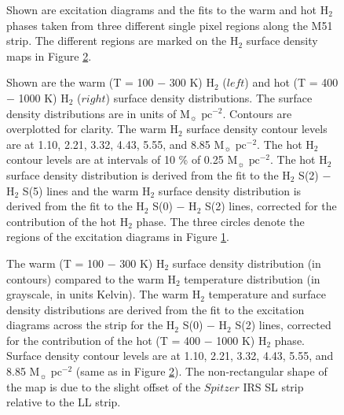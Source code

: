 \documentclass[12pt,preprint]{aastex}
\begin{document}
\clearpage

\begin{figure}
\caption{Shown are excitation diagrams and the fits to the warm
and hot H$_2$ phases taken from three different single pixel regions along the M51 strip. 
The different regions are marked on the H$_2$ surface density maps 
in Figure \ref{figure-4}.}
\label{figure-3}
\end{figure}

\clearpage

\begin{figure}
\caption{Shown are the warm (T = 100 $-$ 300 K) 
H$_2$ ($left$) and hot (T = 400 $-$ 1000 K) 
H$_2$ ($right$) surface density distributions.  The surface density
 distributions are in units of $\mathrm{M_\sun}$ 
$\mathrm{pc^{-2}}$.   Contours are overplotted for clarity.  
The warm H$_2$ surface density contour levels are at 
1.10, 2.21, 3.32, 4.43, 5.55, and 8.85 $\mathrm{M_\sun}$ $\mathrm{pc^{-2}}$.  
The hot H$_2$ contour 
levels are at intervals of 10 \% of 0.25 $\mathrm{M_\sun}$ $\mathrm{pc^{-2}}$.  
The hot H$_2$ surface density distribution is derived 
from the fit to the H$_2$ S(2) $-$ 
H$_2$ S(5) lines and the warm H$_2$ 
surface density distribution is derived from the fit to the 
H$_2$ S(0) $-$ H$_2$ S(2) lines, 
corrected for the contribution of the hot H$_2$ phase.
The three circles denote the regions of the excitation diagrams in Figure \ref{figure-3}.}
\label{figure-4}
\end{figure}

\clearpage

\begin{figure}
\caption{The warm (T = 100 $-$ 300 K) H$_2$ surface 
density distribution (in contours) compared 
to the warm H$_2$ temperature distribution 
(in grayscale, in units Kelvin).  The warm H$_2$ 
temperature and surface density distributions are derived from the fit to the excitation 
diagrams across the strip for the H$_2$ S(0) $-$ H$_2$ S(2) lines, 
corrected for the contribution of the hot (T = 400 $-$ 1000 K) H$_2$ phase.  
Surface density contour levels are at 
1.10, 2.21, 3.32, 4.43, 5.55, and 8.85 $\mathrm{M_\sun}$ $\mathrm{pc^{-2}}$ 
(same as in Figure \ref{figure-4}). The non-rectangular shape of the 
map is due to the slight offset of the $Spitzer$ IRS SL 
strip relative to the LL strip.}
\label{figure-5}
\end{figure}
\end{document}

